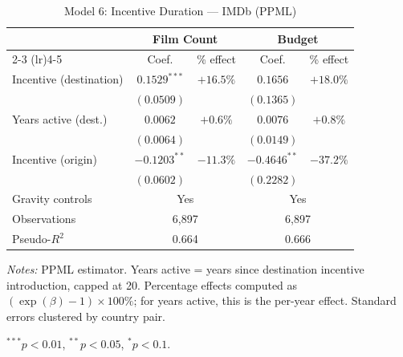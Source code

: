 \begin{table}[htbp]
\centering
\caption{Model 6: Incentive Duration --- IMDb (PPML)}
\label{tab:model6}
\small
\begin{tabular}{l cc cc}
\toprule
 & \multicolumn{2}{c}{Film Count} & \multicolumn{2}{c}{Budget} \\
\cmidrule(lr){2-3} \cmidrule(lr){4-5}
 & Coef. & \% effect & Coef. & \% effect \\
\midrule
Incentive (destination) & $0.1529^{***}$ & $+16.5\%$ & $0.1656$ & $+18.0\%$ \\
 & $(0.0509)$ & & $(0.1365)$ & \\[4pt]
Years active (dest.) & $0.0062$ & $+0.6\%$ & $0.0076$ & $+0.8\%$ \\
 & $(0.0064)$ & & $(0.0149)$ & \\[4pt]
Incentive (origin) & $-0.1203^{**}$ & $-11.3\%$ & $-0.4646^{**}$ & $-37.2\%$ \\
 & $(0.0602)$ & & $(0.2282)$ & \\[4pt]
\midrule
Gravity controls & \multicolumn{2}{c}{Yes} & \multicolumn{2}{c}{Yes} \\
Observations & \multicolumn{2}{c}{6,897} & \multicolumn{2}{c}{6,897} \\
Pseudo-$R^2$ & \multicolumn{2}{c}{0.664} & \multicolumn{2}{c}{0.666} \\
\bottomrule
\end{tabular}
\par\vspace{4pt}\noindent\begin{minipage}{\textwidth}
\footnotesize
\par \textit{Notes:} PPML estimator. Years active = years since destination incentive introduction, capped at 20. Percentage effects computed as $(\exp(\beta)-1) \times 100\%$; for years active, this is the per-year effect. Standard errors clustered by country pair.
\par $^{***}p<0.01$, $^{**}p<0.05$, $^{*}p<0.1$.
\end{minipage}
\end{table}

\clearpage


